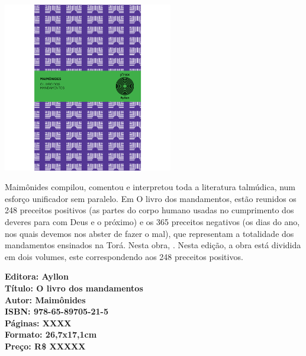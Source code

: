 \pagestyle{ayllon}
\label{ayllon}


\pagebreak

\begin{center}
\hspace*{-3.6cm}
\hspace*{3.1cm}\includegraphics[width=74mm]{./grid/maimon.jpg}
\end{center}

\hspace*{-7cm}\hrulefill\hspace*{-7cm}

\medskip

\noindent{}Maimônides compilou, comentou e interpretou toda a literatura talmúdica, num esforço unificador sem paralelo. Em O livro dos mandamentos, estão reunidos os 248 preceitos positivos (as partes do corpo humano usadas no cumprimento dos deveres para com Deus e o próximo) e os 365 preceitos negativos (os dias do ano, nos quais devemos nos abster de fazer o mal), que representam a totalidade dos mandamentos ensinados na Torá. Nesta obra, . Nesta edição, a obra está dividida em dois volumes, este correspondendo aos 248 preceitos positivos.

\vfill

\hspace*{-.4cm}\begin{minipage}[c]{1\linewidth}
\small\textbf{
\hspace*{-.1cm}Editora: Ayllon\\
Título: O livro dos mandamentos\\
Autor: Maimônides\\ 
ISBN: 978-65-89705-21-5\\
Páginas: XXXX\\
Formato: 26,7x17,1cm\\
Preço: R\$ XXXXX
}
\end{minipage}


